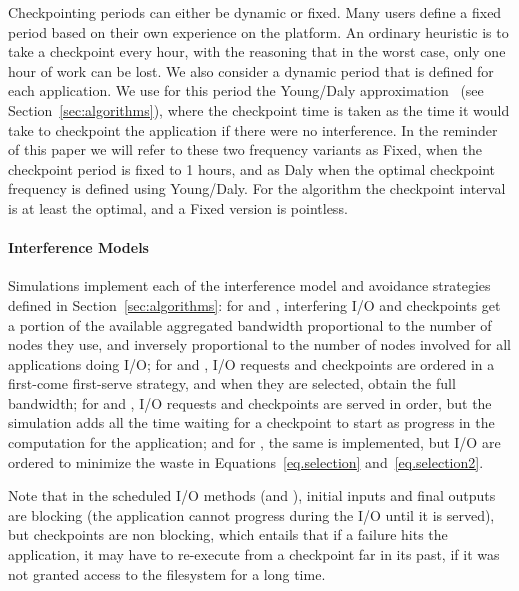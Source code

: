 Checkpointing periods can either be dynamic or fixed. Many users
define a fixed period based on their own experience on the
platform. An ordinary heuristic is to take a checkpoint every hour,
with the reasoning that in the worst case, only one hour of work can
be lost. We also consider a dynamic period that is defined for each
application. We use for this period the Young/Daly
approximation~\cite{young74,daly04} (see Section~\ref{sec:algorithms}),
where the checkpoint time is
taken as the time it would take to checkpoint the application if there
were no interference.%
%
In the reminder of this paper we will refer to these two frequency variants as
Fixed, when the checkpoint period is fixed to 1 hours, and as Daly when the
optimal checkpoint frequency is defined using Young/Daly. For the \leastwaste
algorithm the checkpoint interval is at least the optimal, and a Fixed version
is pointless.

\paragraph*{Interference Models} Simulations implement each of the
interference model and avoidance strategies defined in
Section~\ref{sec:algorithms}: for \propfixed and \propdaly,
interfering I/O and checkpoints get a portion of the available
aggregated bandwidth proportional to the number of nodes they use, and
inversely proportional to the number of nodes involved for all
applications doing I/O; for \bfifofixed and \bfifodaly, I/O requests
and checkpoints are ordered in a first-come first-serve strategy, and
when they are selected, obtain the full bandwidth; for \fifofixed and
\fifodaly, I/O requests and checkpoints are served in order, but the
simulation adds all the time waiting for a checkpoint to start as
progress in the computation for the application; and for \cooperative,
the same is implemented, but I/O are ordered to minimize the waste in
Equations~\eqref{eq.selection} and~\eqref{eq.selection2}.

Note that in the scheduled I/O methods (\fifononblock and \cooperative),
initial inputs and final outputs are blocking (the application
cannot progress during the I/O until it is served), but checkpoints
are non blocking, which entails that if a failure hits the application,
it may have to re-execute from a checkpoint far in its past, if it was not
granted access to the filesystem for a long time.

